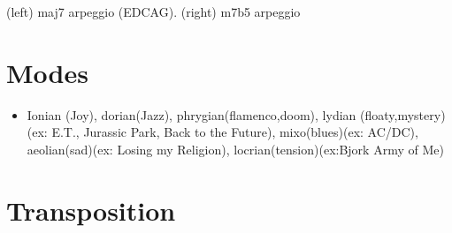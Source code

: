 \documentclass{article}
\begin{document}
\begin{table}[!h]
	\hspace*{-4.2cm}
	\scalebox{0.52}{}
	\hspace*{-0cm}
	\scalebox{0.52}{}

	\hspace*{-4.2cm}
	\scalebox{0.52}{}
	\hspace*{-0cm}
	\scalebox{0.52}{}

	\hspace*{-4.2cm}
	\scalebox{0.52}{}
	\hspace*{-0cm}
	\scalebox{0.52}{}

	\hspace*{-4.2cm}
	\scalebox{0.52}{}
	\hspace*{-0cm}
	\scalebox{0.52}{}

	\hspace*{-4.2cm}
	\scalebox{0.52}{}
	\hspace*{-0cm}
	\scalebox{0.52}{}

	\caption{(left) maj7 arpeggio (EDCAG). (right) m7b5 arpeggio}
	\label{fig:arpeggio2}
\end{table}



\newpage
\section{Modes}

\begin{itemize}
	\item Ionian (Joy), dorian(Jazz), phrygian(flamenco,doom), lydian (floaty,mystery) (ex: E.T., Jurassic Park, Back to the Future), mixo(blues)(ex: AC/DC), aeolian(sad)(ex: Losing my Religion), locrian(tension)(ex:Bjork Army of Me)
\end{itemize}

\newpage
\section{Transposition}
\end{document}
